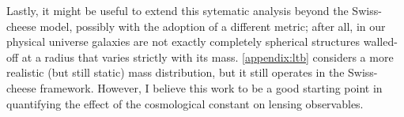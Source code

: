 Lastly, it might be useful to extend this sytematic analysis beyond the Swiss-cheese model, possibly with the adoption of a different metric; after all, in our physical universe galaxies are not exactly completely spherical structures walled-off at a radius that varies strictly with its mass. \autoref{appendix:ltb} considers a more realistic (but still static) mass distribution, but it still operates in the Swiss-cheese framework. However, I believe this work to be a good starting point in quantifying the effect of the cosmological constant on lensing observables. 

